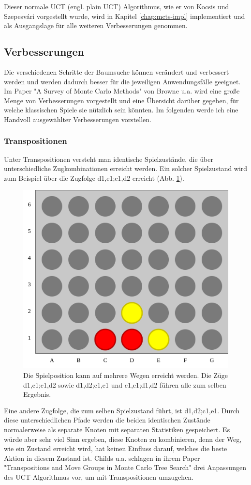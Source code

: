 Dieser normale UCT (engl. plain UCT) Algorithmus, wie er von Kocsis und Szepesv\'{a}ri vorgestellt wurde, wird in Kapitel \ref{chap:mcts-impl} implementiert und als Ausgangslage für alle weiteren Verbesserungen genommen. 

\subsection{Verbesserungen}
Die verschiedenen Schritte der Baumsuche können verändert und verbessert werden und werden dadurch besser für die jeweiligen Anwendungsfälle geeignet. Im Paper "A Survey of Monte Carlo Methods" von Browne u.a.\autocite{browneSurveyMonteCarlo2012} wird eine große Menge von Verbesserungen vorgestellt und eine Übersicht darüber gegeben, für welche klassischen Spiele sie nützlich sein könnten. Im folgenden werde ich eine Handvoll ausgewählter Verbesserungen vorstellen.

\subsubsection{Transpositionen}
\label{transpos}
Unter Transpositionen versteht man identische Spielzustände, die über unterschiedliche Zugkombinationen erreicht werden. Ein solcher Spielzustand wird zum Beispiel über die Zugfolge d1,e1;c1,d2 erreicht (Abb. \ref{fig:c4transpos}).

\begin{figure}[hbt!]
	\centering
	\includegraphics[width=0.6\linewidth]{c4_transpos}
	\caption[Transposition in "Vier gewinnt"]{Die Spielposition kann auf mehrere Wegen erreicht werden. Die Züge d1,e1;c1,d2 sowie d1,d2;c1,e1 und c1,e1;d1,d2 führen alle zum selben Ergebnis.}
	\label{fig:c4transpos}
\end{figure}

Eine andere Zugfolge, die zum selben Spielzustand führt, ist d1,d2;c1,e1. Durch diese unterschiedlichen Pfade werden die beiden identischen Zustände normalerweise als separate Knoten mit separaten Statistiken gespeichert. Es würde aber sehr viel Sinn ergeben, diese Knoten zu kombinieren, denn der Weg, wie ein Zustand erreicht wird, hat keinen Einfluss darauf, welches die beste Aktion in diesem Zustand ist. Childs u.a. schlagen in ihrem Paper "Transpositions and Move Groups in Monte Carlo Tree Search"\autocite[\ppno~390\psq]{childsTranspositionsMoveGroups2008} drei Anpassungen des UCT-Algorithmus vor, um mit Transpositionen umzugehen. 

